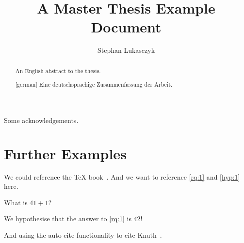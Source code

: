 \documentclass[%
  chapterprefix=false,%
  open=right,%
  twoside=true,%
  paper=a4,%
  logofile={logo.pdf},%
  thesistype=master,%
  UKenglish,%
]{se2thesis}
\author{Stephan Lukasczyk}
\title{A Master Thesis Example Document}
\institute{Chair of Example}
\begin{document}
\frontmatter

\maketitle

\authorshipDeclaration

\begin{abstract}
  An English abstract to the thesis.
\end{abstract}

\begin{abstract}[german]
  Eine deutschsprachige Zusammenfassung der Arbeit.
\end{abstract}

\begin{acknowledgements}
  Some acknowledgements.
\end{acknowledgements}

\tableofcontents

\mainmatter

\blinddocument

\section{Further Examples}

We could reference the \TeX{} book~\autocite{Knu86}.  And we want to reference
\cref{rq:1} and \cref{hyp:1} here.

\begin{resq}\label{rq:1}
    What is \(41 + 1\)?
\end{resq}

\begin{hyp}\label{hyp:1}
  We hypothesise that the answer to \cref{rq:1} is 42!
\end{hyp}

And using the auto-cite functionality to cite Knuth~\autocite{Knu86}.

\backmatter

\printbibliography
\end{document}
